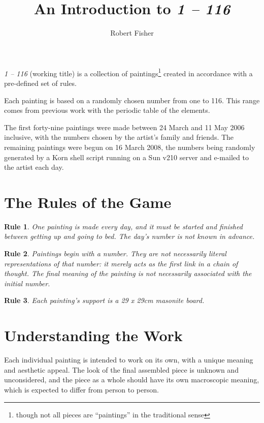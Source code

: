 \documentclass[a4,10pt]{amsart}
\author{Robert Fisher}
\title{An Introduction to \emph{1 -- 116}}
\begin{document}
\maketitle

\emph{1 -- 116} (working title) is a collection of paintings\footnote{though
not all pieces are ``paintings'' in the traditional sense} created in
accordance with a pre-defined set of rules. 

Each painting is based on a randomly chosen number from one to 116. This
range comes from previous work with the periodic table of the
elements.

The first forty-nine paintings were made between 24 March and 11
May 2006 inclusive, with the numbers chosen by the artist's family and 
friends. The remaining paintings were begun on 16 March 2008, the
numbers being randomly generated by a Korn shell script running on a Sun
v210 server and e-mailed to the artist each day.

\section{The Rules of the Game}

\newtheorem{rules}{Rule}

\begin{rules}One painting is made every day, and it must be started and
finished between getting up and going to bed. The day's number is not known
in advance.
\end{rules}

\begin{rules}Paintings \emph{begin} with a number. They are not necessarily
literal representations of that number: it merely acts as the first link in
a chain of thought. The final meaning of the painting is not necessarily
associated with the initial number.
\end{rules}

\begin{rules}Each painting's support is a 29 x 29cm masonite board.
\end{rules}

\section{Understanding the Work}

Each individual painting is intended to work on its own, with a unique
meaning and aesthetic appeal. The look of the final assembled piece is
unknown and unconsidered, and the piece as a whole should have its own
macroscopic meaning, which is expected to differ from person to person.
\end{document}
